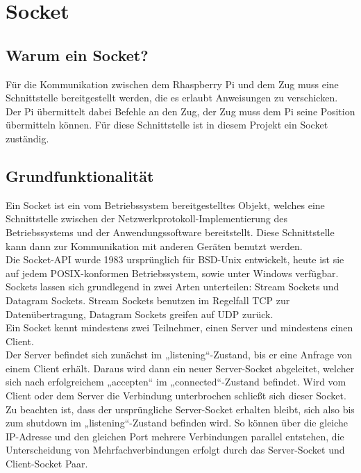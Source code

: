 \chapter{Socket}

\section{Warum ein Socket?}

Für die Kommunikation zwischen dem Rhaspberry Pi und dem Zug muss eine Schnittstelle bereitgestellt werden, die es erlaubt Anweisungen zu verschicken. Der Pi übermittelt dabei Befehle an den Zug, der Zug muss dem Pi seine Position übermitteln können.
Für diese Schnittstelle ist in diesem Projekt ein Socket zuständig.

\section{Grundfunktionalität}
\label{sec:grundfunktionalität}

Ein Socket ist ein vom Betriebssystem bereitgestelltes Objekt, welches eine Schnittstelle zwischen der Netzwerkprotokoll-Implementierung des Betriebssystems und der Anwendungssoftware bereitstellt. Diese Schnittstelle kann dann zur Kommunikation mit anderen Geräten benutzt werden.\\
Die Socket-API wurde 1983 ursprünglich für BSD-Unix entwickelt, heute ist sie auf jedem POSIX-konformen Betriebssystem, sowie unter Windows verfügbar.\\
Sockets lassen sich grundlegend in zwei Arten unterteilen: Stream Sockets und Datagram Sockets. Stream Sockets benutzen im Regelfall TCP zur Datenübertragung, Datagram Sockets greifen auf UDP zurück.\\
Ein Socket kennt mindestens zwei Teilnehmer, einen Server und mindestens einen Client. \\
Der Server befindet sich zunächst im „listening“-Zustand, bis er eine Anfrage von einem Client erhält. Daraus wird dann ein neuer Server-Socket abgeleitet, welcher sich nach erfolgreichem „accepten“ im „connected“-Zustand befindet. Wird vom Client oder dem Server die Verbindung unterbrochen schließt sich dieser Socket.\\
Zu beachten ist, dass der ursprüngliche Server-Socket erhalten bleibt, sich also bis zum shutdown im „listening“-Zustand befinden wird. So können über die gleiche IP-Adresse und den gleichen Port mehrere Verbindungen parallel entstehen, die Unterscheidung von Mehrfachverbindungen erfolgt durch das Server-Socket und Client-Socket Paar.

